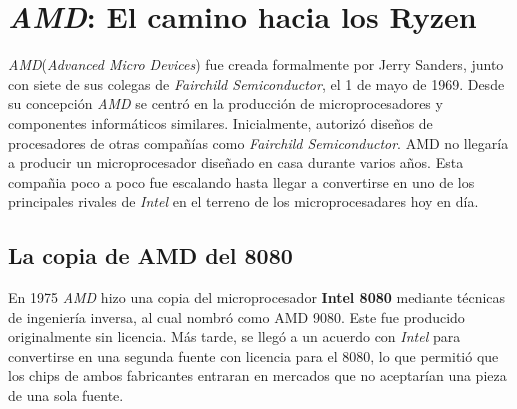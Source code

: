 \section{\emph{AMD}: El camino hacia los \textbf{Ryzen}}
\emph{AMD}(\emph{Advanced Micro Devices}) fue creada formalmente por Jerry Sanders, junto con siete de sus colegas de \emph{Fairchild Semiconductor}, el 1 de mayo de 1969.
Desde su concepción  \emph{AMD} se centró en la producción de microprocesadores y componentes informáticos similares. Inicialmente,
autorizó diseños de procesadores de otras compañías como \emph{Fairchild Semiconductor}. AMD no llegaría a producir un microprocesador 
diseñado en casa durante varios años. Esta compañia poco a poco fue escalando hasta llegar a convertirse en uno de los principales 
rivales de \emph{Intel} en el terreno de los microprocesadares hoy en día.

\subsection{La copia de AMD del 8080}
En 1975  \emph{AMD} hizo una copia del microprocesador \textbf{Intel 8080} mediante técnicas de ingeniería inversa, al cual nombró como AMD 9080.
Este fue producido originalmente sin licencia. Más tarde, se llegó a un acuerdo con \emph{Intel} para convertirse en una segunda fuente con licencia 
para el 8080, lo que permitió que los chips de ambos fabricantes entraran en mercados que no aceptarían una pieza de una sola fuente.


